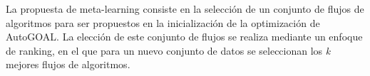 \begin{conclusions}
    La propuesta de meta-learning consiste en la selección de un conjunto de
    flujos de algoritmos para ser propuestos en la inicialización de la
    optimización de AutoGOAL. La elección de este conjunto de flujos se realiza
    mediante un enfoque de ranking, en el que para un nuevo conjunto de datos
    se seleccionan los \emph{k} mejores flujos de algoritmos.

\end{conclusions}
